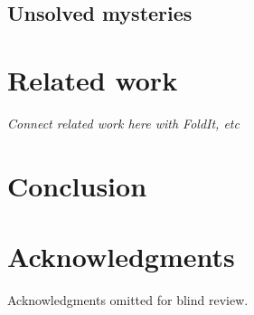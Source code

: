 \documentclass{sigchi}
\begin{document}
\subsection{Unsolved mysteries}

\section{Related work}

\emph{Connect related work here with FoldIt, etc}

\section{Conclusion}

\section{Acknowledgments}
Acknowledgments omitted for blind review.

\balance






\end{document}
